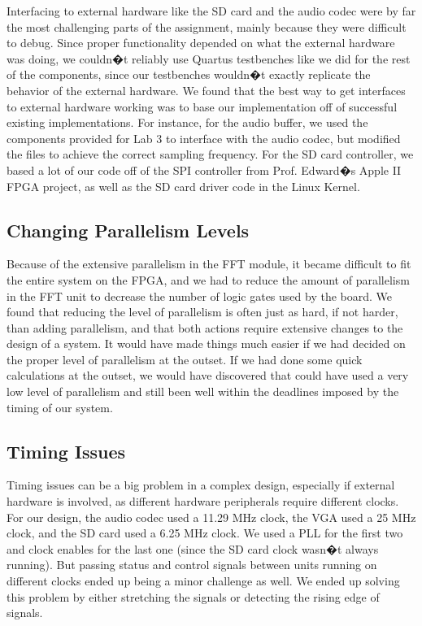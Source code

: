 \documentclass{article}
\begin{document}
Interfacing to external hardware like the SD card and the audio codec were by far the 
most challenging parts of the assignment, mainly because they were difficult to 
debug. Since proper functionality depended on what the external hardware was 
doing, we couldn�t reliably use Quartus testbenches like we did for the rest of the 
components, since our testbenches wouldn�t exactly replicate the behavior of the 
external hardware. We found that the best way to get interfaces to external hardware 
working was to base our implementation off of successful existing implementations. 
For instance, for the audio buffer, we used the components provided for Lab 3 to 
interface with the audio codec, but modified the files to achieve the correct sampling 
frequency. For the SD card controller, we based a lot of our code off of the SPI 
controller from Prof. Edward�s Apple II FPGA project, as well as the SD card driver 
code in the Linux Kernel. 

\subsection{Changing Parallelism Levels}

Because of the extensive parallelism in the FFT module, it became difficult to fit the 
entire system on the FPGA, and we had to reduce the amount of parallelism in the 
FFT unit to decrease the number of logic gates used by the board. We found that 
reducing the level of parallelism is often just as hard, if not harder, than adding 
parallelism, and that both actions require extensive changes to the design of a 
system. It would have made things much easier if we had decided on the proper level 
of parallelism at the outset. If we had done some quick calculations at the outset, we 
would have discovered that could have used a very low level of parallelism and still 
been well within the deadlines imposed by the timing of our system.

\subsection{Timing Issues}

Timing issues can be a big problem in a complex design, especially if external 
hardware is involved, as different hardware peripherals require different clocks. For 
our design, the audio codec used a 11.29 MHz clock, the VGA used a 25 MHz clock, 
and the SD card used a 6.25 MHz clock. We used a PLL for the first two and clock 
enables for the last one (since the SD card clock wasn�t always running). But passing 
status and control signals between units running on different clocks ended up being a 
minor challenge as well. We ended up solving this problem by either stretching the 
signals or detecting the rising edge of signals. 
\end{document}

